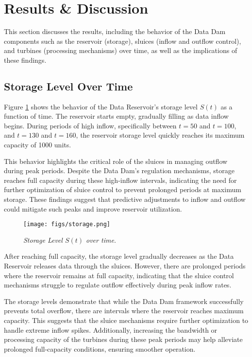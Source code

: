 \section{ Results \& Discussion}
This section discusses the results, including the behavior of the Data Dam components such as the reservoir (storage), sluices (inflow and outflow control), and turbines (processing mechanisms) over time, as well as the implications of these findings.

\subsection{Storage Level Over Time}
Figure \ref{fig:storage} shows the behavior of the Data Reservoir's storage level \( S(t) \) as a function of time. The reservoir starts empty, gradually filling as data inflow begins. During periods of high inflow, specifically between \( t = 50 \) and \( t = 100 \), and \( t = 130 \) and \( t = 160 \), the reservoir storage level quickly reaches its maximum capacity of 1000 units.

This behavior highlights the critical role of the sluices in managing outflow during peak periods. Despite the Data Dam's regulation mechanisms, storage reaches full capacity during these high-inflow intervals, indicating the need for further optimization of sluice control to prevent prolonged periods at maximum storage. These findings suggest that predictive adjustments to inflow and outflow could mitigate such peaks and improve reservoir utilization.



\begin{figure}[H] %
    \centering
        \texttt{[image: figs/storage.png]} %
        \caption{\textit{Storage Level \( S(t) \) over time.}} %
        \label{fig:storage}
 
\end{figure}

After reaching full capacity, the storage level gradually decreases as the Data Reservoir releases data through the sluices. However, there are prolonged periods where the reservoir remains at full capacity, indicating that the sluice control mechanisms struggle to regulate outflow effectively during peak inflow rates.

The storage levels demonstrate that while the Data Dam framework successfully prevents total overflow, there are intervals where the reservoir reaches maximum capacity. This suggests that the sluice mechanisms require further optimization to handle extreme inflow spikes. Additionally, increasing the bandwidth or processing capacity of the turbines during these peak periods may help alleviate prolonged full-capacity conditions, ensuring smoother operation.

